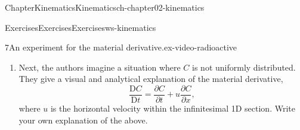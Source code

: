\documentclass[oneside,10pt,]{book}
\numberwithin{equation}{section}
\newcommand{\DD}[2]{\frac{\mathrm{D}#1}{\mathrm{D}#2}}
\newcommand{\pd}[2]{\frac{\partial#1}{\partial#2}}
\begin{document}
\begin{chapterptx}{Chapter}{Kinematics}{}{Kinematics}{}{}{ch-chapter02-kinematics}
\begin{exercises-section}{Exercises}{Exercises}{}{Exercises}{}{}{ws-kinematics}
\begin{divisionexercise}{7}{An experiment for the material derivative.}{}{ex-video-radioactive}
\begin{enumerate}[font=\bfseries,label=(\alph*),ref=\alph*]
\item{}Next, the authors imagine a situation where \(C\) is not uniformly distributed. They give a visual and analytical explanation of the material derivative,%
\begin{equation*}
\DD{C}{t} = \pd{C}{t} + u \pd{C}{x},
\end{equation*}
where \(u\) is the horizontal velocity within the infinitesimal 1D section. Write your own explanation of the above.%
\end{enumerate}%
\end{divisionexercise}%
\end{exercises-section}
\end{chapterptx}
%
%
\typeout{************************************************}
\typeout{************************************************}
%
\end{document}
